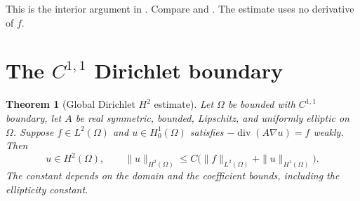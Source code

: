 \documentclass[11pt,oneside,openany]{book}
\theoremstyle{plain}
\newtheorem{theorem}{Theorem}[chapter]
\theoremstyle{definition}
\theoremstyle{remark}
\begin{document}
This is the interior argument in \cite[Section 6.3.1]{Evans}.
Compare \cite[Section 9.5.1]{RR} and \cite[Section 8.3]{GT}.
The estimate uses no derivative of \(f\).

\section{The \texorpdfstring{\(C^{1,1}\)}{C(1,1)} Dirichlet boundary}\label{pde:E06}

\begin{theorem}[Global Dirichlet \(H^2\) estimate]\label{pde:elliptic-global-h2}
Let \(\Omega\) be bounded with \(C^{1,1}\) boundary, let \(A\)
be real symmetric, bounded, Lipschitz, and uniformly elliptic
on \(\Omega\). Suppose \(f\in L^2(\Omega)\) and \(u\in H_0^1(\Omega)\)
satisfies \(-\operatorname{div}(A\nabla u)=f\) weakly. Then
\[
 u\in H^2(\Omega),\qquad
 \|u\|_{H^2(\Omega)}\leq C
    \bigl(\|f\|_{L^2(\Omega)}+\|u\|_{H^1(\Omega)}\bigr).
\]
The constant depends on the domain and the coefficient bounds,
including the ellipticity constant.
\end{theorem}
\end{document}
